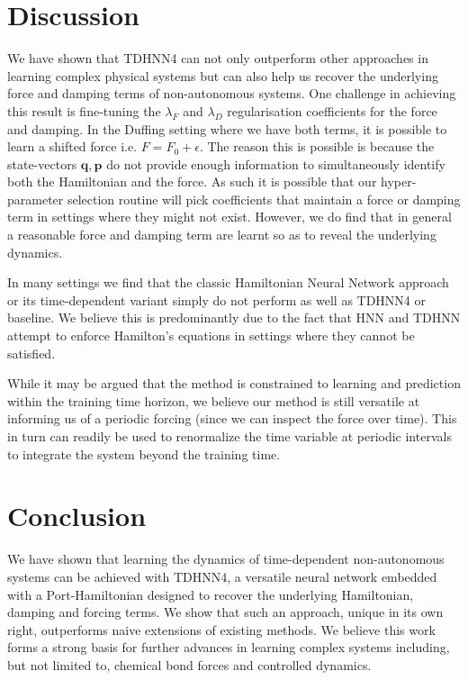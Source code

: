 \documentclass{article}
\begin{document}
\section{Discussion}

We have shown that TDHNN4 can not only outperform other approaches in learning complex physical systems but can also help us recover the underlying force and damping terms of non-autonomous systems. One challenge in achieving this result is fine-tuning the $\lambda_F$ and $\lambda_D$ regularisation coefficients for the force and damping. In the Duffing setting where we have both terms, it is possible to learn a shifted force i.e. $F = F_0 + \epsilon$. The reason this is possible is because the state-vectors $\mathbf{q},\mathbf{p}$ do not provide enough information to simultaneously identify both the Hamiltonian and the force. As such it is possible that our hyper-parameter selection routine will pick coefficients that maintain a force or damping term in settings where they might not exist. However, we do find that in general a reasonable force and damping term are learnt so as to reveal the underlying dynamics.


In many settings we find that the classic Hamiltonian Neural Network approach or its time-dependent variant simply do not perform as well as TDHNN4 or baseline. We believe this is predominantly due to the fact that HNN and TDHNN attempt to enforce Hamilton's equations in settings where they cannot be satisfied.

While it may be argued that the method is constrained to learning and prediction within the training time horizon, we believe our method is still versatile at informing us of a periodic forcing (since we can inspect the force over time). This in turn can readily be used to renormalize the time variable at periodic intervals to integrate the system beyond the training time.

\section{Conclusion}

We have shown that learning the dynamics of time-dependent non-autonomous systems can be achieved with TDHNN4, a versatile neural network embedded with a Port-Hamiltonian designed to recover the underlying Hamiltonian, damping and forcing terms. We show that such an approach, unique in its own right, outperforms naive extensions of existing methods. We believe this work forms a strong basis for further advances in learning complex systems including, but not limited to, chemical bond forces and controlled dynamics. 




\end{document}

